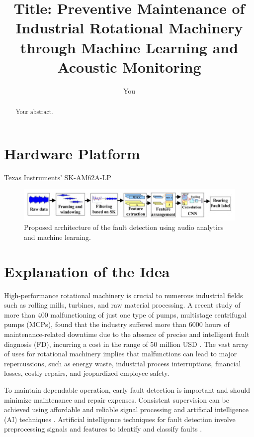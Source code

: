 \documentclass[12pt]{article}
\title{Title: Preventive Maintenance of Industrial Rotational Machinery through Machine Learning and Acoustic Monitoring}
\author{You}
\begin{document}
\maketitle

\begin{abstract}
Your abstract.
\end{abstract}

\section{Hardware Platform}

Texas Instruments’ SK-AM62A-LP

\begin{figure}
\centering
\includegraphics[width=0.9\linewidth]{figs/fig-arch1.png}
\caption{\label{fig:arch1}Proposed architecture of the fault detection using audio analytics and machine learning.}
\end{figure}


\section{Explanation of the Idea}

High-performance rotational machinery is crucial to numerous industrial fields such as rolling mills, turbines, and raw material processing.
A recent study of more than 400 malfunctioning of just one type of pumps, multistage centrifugal pumps (MCPs), found that the industry suffered more than 6000 hours of maintenance-related downtime due to the absence of precise and intelligent fault diagnosis (FD), incurring a cost in the range of 50 million USD \cite{rane2021re}.
The vast array of uses for rotational machinery implies that malfunctions can lead to major repercussions, such as energy waste, industrial process interruptions, financial losses, costly repairs, and jeopardized employee safety. 

To maintain dependable operation, early fault detection is important and should minimize maintenance and repair expenses. Consistent supervision can be achieved using affordable and reliable signal processing and artificial intelligence (AI) techniques \cite{sunal2022review}. Artificial intelligence techniques for fault detection involve preprocessing signals and features to identify and classify faults \cite{saeed2021fault, jiang2019bearing}.
\end{document}
